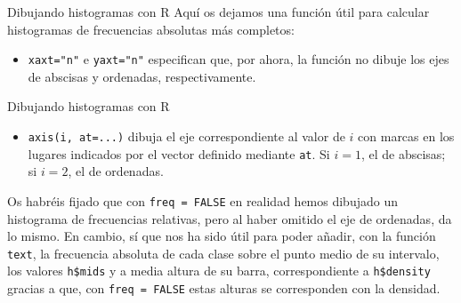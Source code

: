 \documentclass[
  ignorenonframetext,
  aspectratio=169]{beamer}
\newenvironment{Shaded}{\begin{snugshade}}{\end{snugshade}}
\newcommand{\AttributeTok}[1]{\textcolor[rgb]{0.77,0.63,0.00}{#1}}
\newcommand{\ConstantTok}[1]{\textcolor[rgb]{0.00,0.00,0.00}{#1}}
\newcommand{\ControlFlowTok}[1]{\textcolor[rgb]{0.13,0.29,0.53}{\textbf{#1}}}
\newcommand{\DecValTok}[1]{\textcolor[rgb]{0.00,0.00,0.81}{#1}}
\newcommand{\FunctionTok}[1]{\textcolor[rgb]{0.00,0.00,0.00}{#1}}
\newcommand{\NormalTok}[1]{#1}
\newcommand{\OtherTok}[1]{\textcolor[rgb]{0.56,0.35,0.01}{#1}}
\newcommand{\SpecialCharTok}[1]{\textcolor[rgb]{0.00,0.00,0.00}{#1}}
\newcommand{\StringTok}[1]{\textcolor[rgb]{0.31,0.60,0.02}{#1}}
\providecommand{\tightlist}{%
  \setlength{\itemsep}{0pt}\setlength{\parskip}{0pt}}
\begin{document}
\begin{frame}[fragile]{Dibujando histogramas con R}
\protect\hypertarget{dibujando-histogramas-con-r-3}{}
Aquí os dejamos una función útil para calcular histogramas de
frecuencias absolutas más completos:

\begin{Shaded}
\end{Shaded}

\begin{itemize}
\tightlist
\item
  \texttt{xaxt="n"} e \texttt{yaxt="n"} especifican que, por ahora, la
  función no dibuje los ejes de abscisas y ordenadas, respectivamente.
\end{itemize}
\end{frame}

\begin{frame}[fragile]{Dibujando histogramas con R}
\protect\hypertarget{dibujando-histogramas-con-r-4}{}
\begin{itemize}
\tightlist
\item
  \texttt{axis(i,\ at=...)} dibuja el eje correspondiente al valor de
  \(i\) con marcas en los lugares indicados por el vector definido
  mediante \texttt{at}. Si \(i=1\), el de abscisas; si \(i=2\), el de
  ordenadas.
\end{itemize}

Os habréis fijado que con \texttt{freq\ =\ FALSE} en realidad hemos
dibujado un histograma de frecuencias relativas, pero al haber omitido
el eje de ordenadas, da lo mismo. En cambio, sí que nos ha sido útil
para poder añadir, con la función \texttt{text}, la frecuencia absoluta
de cada clase sobre el punto medio de su intervalo, los valores
\texttt{h\$mids} y a media altura de su barra, correspondiente a
\texttt{h\$density} gracias a que, con \texttt{freq\ =\ FALSE} estas
alturas se corresponden con la densidad.
\end{frame}
\end{document}
